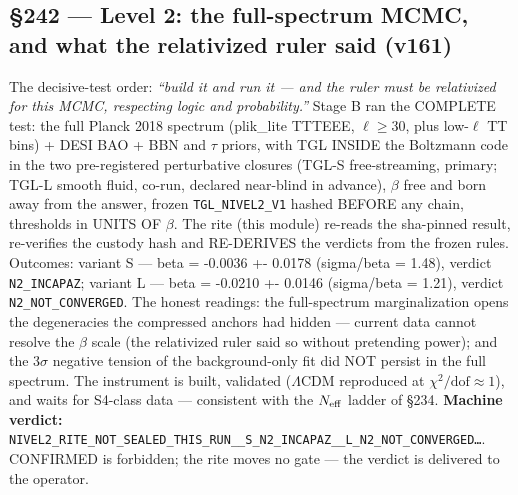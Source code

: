 \documentclass[11pt]{article}
\theoremstyle{definition}\newtheorem{deriv}{Derivation}
\begin{document}
\subsection*{\S242 --- Level 2: the full-spectrum MCMC, and what the relativized ruler said (v161)}The decisive-test order: \emph{``build it and run it --- and the ruler must be relativized for this MCMC, respecting logic and probability.''} Stage B ran the COMPLETE test: the full Planck 2018 spectrum (plik\_lite TTTEEE, $\ell{\geq}30$, plus low-$\ell$ TT bins) + DESI BAO + BBN and $\tau$ priors, with TGL INSIDE the Boltzmann code in the two pre-registered perturbative closures (TGL-S free-streaming, primary; TGL-L smooth fluid, co-run, declared near-blind in advance), $\beta$ free and born away from the answer, frozen \texttt{TGL\_NIVEL2\_V1} hashed BEFORE any chain, thresholds in UNITS OF $\beta$. The rite (this module) re-reads the sha-pinned result, re-verifies the custody hash and RE-DERIVES the verdicts from the frozen rules. Outcomes: variant S --- beta = -0.0036 +- 0.0178 (sigma/beta = 1.48), verdict \texttt{N2\_INCAPAZ}; variant L --- beta = -0.0210 +- 0.0146 (sigma/beta = 1.21), verdict \texttt{N2\_NOT\_CONVERGED}. The honest readings: the full-spectrum marginalization opens the degeneracies the compressed anchors had hidden --- current data cannot resolve the $\beta$ scale (the relativized ruler said so without pretending power); and the $3\sigma$ negative tension of the background-only fit did NOT persist in the full spectrum. The instrument is built, validated ($\Lambda$CDM reproduced at $\chi^2/\mathrm{dof}{\approx}1$), and waits for S4-class data --- consistent with the $N_{\rm eff}$ ladder of \S234. \textbf{Machine verdict:} \texttt{NIVEL2\_RITE\_NOT\_SEALED\_THIS\_RUN\_\_S\_N2\_INCAPAZ\_\_L\_N2\_NOT\_CONVERGED\ldots}. CONFIRMED is forbidden; the rite moves no gate --- the verdict is delivered to the operator.
\end{document}
